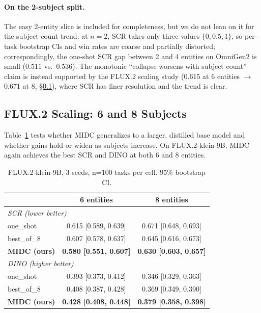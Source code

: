 \documentclass[letterpaper]{article}
\begin{document}
\paragraph{On the 2-subject split.} The easy 2-entity slice is included for completeness, but we do not lean on it for the subject-count trend: at $n{=}2$, SCR takes only three values $\{0, 0.5, 1\}$, so per-task bootstrap CIs and win rates are coarse and partially distorted; correspondingly, the one-shot SCR gap between 2 and 4 entities on OmniGen2 is small ($0.511$ vs.\ $0.536$). The monotonic ``collapse worsens with subject count'' claim is instead supported by the FLUX.2 scaling study ($0.615$ at 6 entities $\to$ $0.671$ at 8, \S\ref{sec:scaling}), where SCR has finer resolution and the trend is clear.

\subsection{FLUX.2 Scaling: 6 and 8 Subjects}
\label{sec:scaling}

Table~\ref{tab:flux2} tests whether MIDC generalizes to a larger, distilled base model and whether gains hold or widen as subjects increase. On FLUX.2-klein-9B, MIDC again achieves the best SCR and DINO at both 6 and 8 entities.

\begin{table}[ht]
\centering
\small
\caption{FLUX.2-klein-9B, 3 seeds, n=100 tasks per cell. 95\% bootstrap CI.}
\label{tab:flux2}
\begin{tabular}{lcc}
\toprule
& 6 entities & 8 entities \\
\midrule
\multicolumn{3}{l}{\textit{SCR (lower better)}} \\
\midrule
one\_shot & 0.615 [0.589, 0.639] & 0.671 [0.648, 0.693] \\
best\_of\_8 & 0.607 [0.578, 0.637] & 0.645 [0.616, 0.673] \\
\textbf{MIDC (ours)} & \textbf{0.580 [0.551, 0.607]} & \textbf{0.630 [0.603, 0.657]} \\
\midrule
\multicolumn{3}{l}{\textit{DINO (higher better)}} \\
\midrule
one\_shot & 0.393 [0.373, 0.412] & 0.346 [0.329, 0.363] \\
best\_of\_8 & 0.408 [0.387, 0.428] & 0.369 [0.349, 0.390] \\
\textbf{MIDC (ours)} & \textbf{0.428 [0.408, 0.448]} & \textbf{0.379 [0.358, 0.398]} \\
\bottomrule
\end{tabular}
\end{table}
\end{document}
